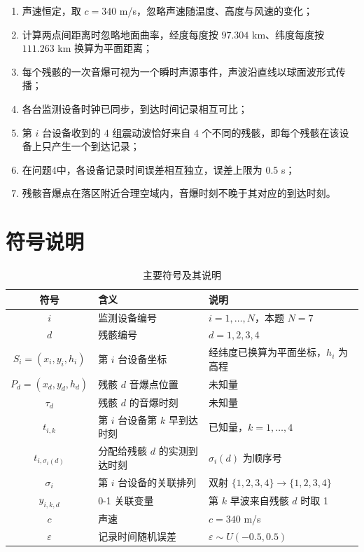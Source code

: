 \documentclass[12pt,a4paper]{article}
\begin{document}
\begin{enumerate}[label=(\arabic*)]
  \item 声速恒定，取 $c=340$ m/s，忽略声速随温度、高度与风速的变化；
  \item 计算两点间距离时忽略地面曲率，经度每度按 $97.304$ km、纬度每度按 $111.263$ km 换算为平面距离；
  \item 每个残骸的一次音爆可视为一个瞬时声源事件，声波沿直线以球面波形式传播；
  \item 各台监测设备时钟已同步，到达时间记录相互可比；
  \item 第 $i$ 台设备收到的 4 组震动波恰好来自 4 个不同的残骸，即每个残骸在该设备上只产生一个到达记录；
  \item 在问题4中，各设备记录时间误差相互独立，误差上限为 0.5 s；
  \item 残骸音爆点在落区附近合理空域内，音爆时刻不晚于其对应的到达时刻。
\end{enumerate}

\section{符号说明}

\begin{table}[H]
\centering
\caption{主要符号及其说明}
\begin{tabular}{clp{7.0cm}}
\toprule
符号 & 含义 & 说明 \\
\midrule
$i$ & 监测设备编号 & $i=1,\dots,N$，本题 $N=7$ \\
$d$ & 残骸编号 & $d=1,2,3,4$ \\
$S_i=(x_i,y_i,h_i)$ & 第 $i$ 台设备坐标 & 经纬度已换算为平面坐标，$h_i$ 为高程 \\
$P_d=(x_d,y_d,h_d)$ & 残骸 $d$ 音爆点位置 & 未知量 \\
$\tau_d$ & 残骸 $d$ 的音爆时刻 & 未知量 \\
$t_{i,k}$ & 第 $i$ 台设备第 $k$ 早到达时刻 & 已知量，$k=1,\dots,4$ \\
$t_{i,\sigma_i(d)}$ & 分配给残骸 $d$ 的实测到达时刻 & $\sigma_i(d)$ 为顺序号 \\
$\sigma_i$ & 第 $i$ 台设备的关联排列 & 双射 $\{1,2,3,4\}\to\{1,2,3,4\}$ \\
$y_{i,k,d}$ & 0-1 关联变量 & 第 $k$ 早波来自残骸 $d$ 时取 1 \\
$c$ & 声速 & $c=340$ m/s \\
$\varepsilon$ & 记录时间随机误差 & $\varepsilon\sim U(-0.5,0.5)$ \\
\bottomrule
\end{tabular}
\end{table}
\end{document}
